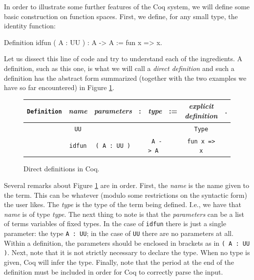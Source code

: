 In order to illustrate some further features of the Coq system, we
will define some basic construction on function spaces.  First, we
define, for any small type, the identity function:
\begin{center}
  \begin{coqcode}
Definition idfun ( A : UU ) : A -> A := fun x => x.
  \end{coqcode}
\end{center}
Let us dissect this line of code and try to understand each of the
ingredients.  A definition, such as this one, is what we will call a
\emph{direct definition} and such a definition has the abstract form
summarized (together with the two examples we have so far encountered)
in Figure \ref{fig:direct}.
\begin{figure}[H]
  \centering
  \begin{tabular}{cccccccc}
    \verb|Definition| & \emph{name} &
    \emph{parameters} & : & \emph{type} & := &
    \emph{explicit definition} & .\\
    \hline
    & \verb|UU| & & & & & \verb|Type| &\\
    & \verb|idfun| & \verb|( A : UU )| &  &
    \verb| A -> A | & & \verb|fun x => x| &
  \end{tabular}
  \caption{Direct definitions in Coq.}
  \label{fig:direct}
\end{figure}

Several remarks about Figure \ref{fig:direct} are in order.  First, the \emph{name} is the name
given to the term.  This can be whatever (modulo some restrictions on
the syntactic form) the user likes.  The \emph{type} is the type of
the term being defined.  I.e., we have that \emph{name} is of type
\emph{type}.  The next thing to note is that the \emph{parameters} can
be a list of terms variables of fixed types.  In the case of
\verb|idfun| there is just a single parameter: the type
\verb|A : UU|; in the case of \verb|UU| there are no
parameters at all.  Within a definition, the parameters should be
enclosed in brackets as in \verb|( A : UU )|.  Next, note that
it is not strictly necessary to declare the type.  When no type is
given, Coq will infer the type.  Finally, note that the period at the
end of the definition must be included in order for Coq to correctly
parse the input.

